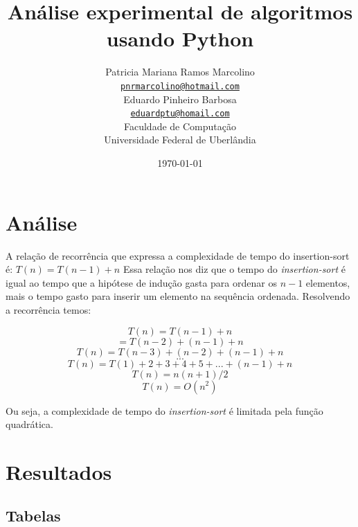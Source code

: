 \documentclass[12pt,a4paper,twoside]{report}
\title{Análise experimental de algoritmos usando Python}
\author{Patricia Mariana Ramos Marcolino \\
\texttt{\small \url{pnrmarcolino@hotmail.com}}
\vspace{1cm} \\
Eduardo Pinheiro Barbosa \\
\texttt{\small \url{eduardptu@homail.com}}
\vspace{1cm} \\
Faculdade de Computação \\
Universidade Federal de Uberlândia
}
\date{\today}
\begin{document}
\maketitle
\listoffigures
\listoftables
\lstlistoflistings

\tableofcontents
\fancyhead[RE,LO]{\thesection}

\setlength{\parskip}{0.15in} %

\chapter{Análise}

A relação de recorrência que expressa a complexidade de tempo do insertion-sort é: $T(n) = T(n - 1) + n $
Essa relação nos diz que o tempo do {\it insertion-sort} é igual ao tempo que a hipótese de indução gasta para ordenar os $n - 1$ elementos, mais o tempo gasto para inserir um elemento na sequência ordenada.
Resolvendo a recorrência temos:

\[T(n) = T(n - 1) + n\]
\[ = T(n - 2) + (n -1) + n\]
\[T(n) = T(n - 3) + (n - 2) + (n - 1) + n\]
\[...\]
\[T(n) = T(1) + 2 + 3 + 4 + 5 + ... + (n - 1) + n\]
\[T(n) = n(n + 1)/2\]
\[T(n) = O(n^2)\]

Ou seja, a complexidade de tempo do {\it insertion-sort} é limitada pela função quadrática.


\chapter{Resultados}
\section{Tabelas}


\end{document}
